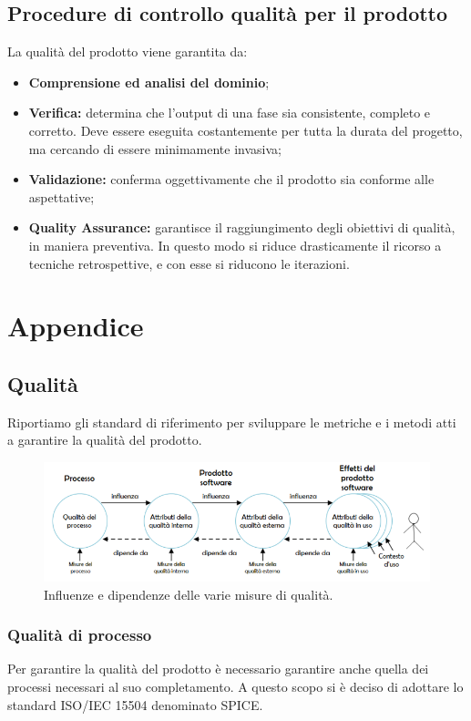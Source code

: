 \documentclass[a4paper]{article}
\begin{document}
		\subsection{Procedure di controllo qualità per il prodotto}
			La qualità del prodotto viene garantita da:
			\begin{itemize}
				\item \textbf{Comprensione ed analisi del dominio};
				\item \textbf{Verifica:} determina che l'output di una fase sia consistente, completo e corretto. 
				Deve essere eseguita costantemente per tutta la durata del progetto, ma cercando di essere minimamente invasiva;
				\item \textbf{Validazione:} conferma oggettivamente che il prodotto sia conforme alle aspettative;
				\item \textbf{Quality Assurance:} garantisce il raggiungimento degli obiettivi di qualità, in maniera preventiva. 
				In questo modo si riduce drasticamente il ricorso a tecniche retrospettive, e con esse si riducono le iterazioni.
			\end{itemize}
		\section{Appendice}
			\subsection{Qualità}
Riportiamo gli standard di riferimento per sviluppare le metriche e i metodi atti a garantire la qualità del prodotto.
				\begin{figure}[H]
					\centering
					\includegraphics[scale=0.65]{immagini/Pdq/QualitaDelProdottoSoftware.PNG}
					\caption{Influenze e dipendenze delle varie misure di qualità.}
				\end{figure}
			\subsubsection{Qualità di processo}
				Per garantire la qualità del prodotto è necessario garantire anche quella dei processi necessari 
				al suo completamento. A questo scopo si è deciso di adottare lo standard 
				ISO/IEC 15504 denominato SPICE.
				
\end{document}
